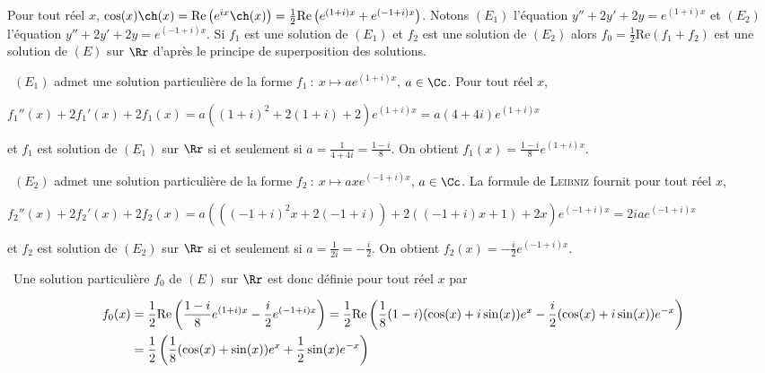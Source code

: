{\begin{enumerate}
{Pour tout réel $x$, $\cos(x)\ch(x)=\text{Re}\left(e^{ix}\ch(x)\right)= \frac{1}{2}\text{Re}\left(e^{(1+i)x}+e^{(-1+i)x}\right)$. Notons $(E_1)$ l'équation $y''+2y'+2y=e^{(1+i)x}$ et $(E_2)$ l'équation $y''+2y'+2y=e^{(-1+i)x}$. Si $f_1$ est une solution de $(E_1)$ et $f_2$ est une solution de $(E_2)$ alors $f_0= \frac{1}{2}\text{Re}(f_1+f_2)$ est une solution de $(E)$ sur $\Rr$ d'après le principe de superposition des solutions.

\textbullet~$(E_1)$ admet une solution particulière de la forme $f_1~:~x\mapsto ae^{(1+i)x}$, $a\in\Cc$. Pour tout réel $x$,

\begin{center}
$f_1''(x)+2f_1'(x)+2f_1(x)=a((1+i)^2+2(1+i)+2)e^{(1+i)x}=a(4+4i)e^{(1+i)x}$
\end{center}

et $f_1$ est solution de $(E_1)$ sur $\Rr$ si et seulement si $a= \frac{1}{4+4i}= \frac{1-i}{8}$. On obtient $f_1(x)= \frac{1-i}{8}e^{(1+i)x}$.

\textbullet~$(E_2)$ admet une solution particulière de la forme $f_2~:~x\mapsto axe^{(-1+i)x}$, $a\in\Cc$. La formule de \textsc{Leibniz} fournit pour tout réel $x$,

\begin{center}
$f_2''(x)+2f_2'(x)+2f_2(x)=a(((-1+i)^2x+2(-1+i))+2((-1+i)x+1)+2x)e^{(-1+i)x}=2iae^{(-1+i)x}$
\end{center}

et $f_2$ est solution de $(E_2)$ sur $\Rr$ si et seulement si $a= \frac{1}{2i}=- \frac{i}{2}$. On obtient $f_2(x)=- \frac{i}{2}e^{(-1+i)x}$.

\textbullet~Une solution particulière $f_0$ de $(E)$ sur $\Rr$ est donc définie pour tout réel $x$ par

\begin{align*}\ensuremath
f_0(x)&= \frac{1}{2}\text{Re}\left( \frac{1-i}{8}e^{(1+i)x}- \frac{i}{2}e^{(-1+i)x}\right)= \frac{1}{2}\text{Re}\left( \frac{1}{8}(1-i)(\cos(x)+i\sin(x))e^{x}- \frac{i}{2}(\cos(x)+i\sin(x))e^{-x}\right)\\
 &= \frac{1}{2}\left( \frac{1}{8}(\cos(x)+\sin(x))e^{x}+ \frac{1}{2}\sin(x)e^{-x}\right)
\end{align*}

\begin{center}
\end{center}}
\end{enumerate}
}
